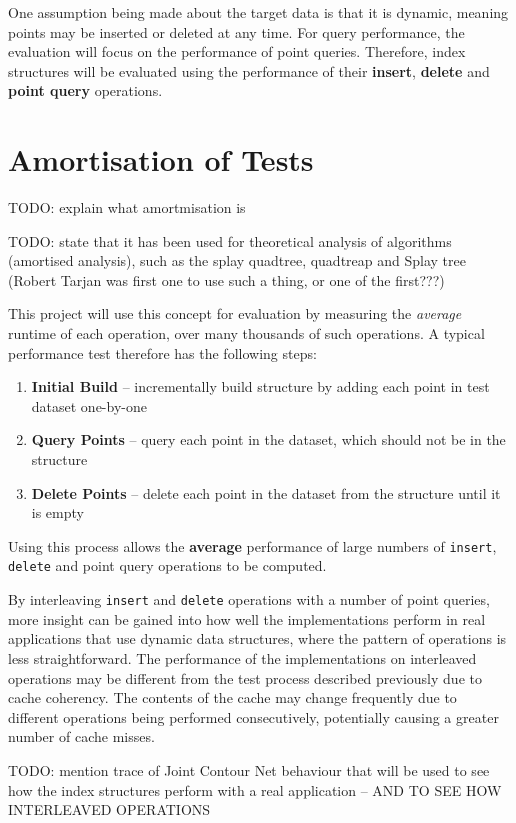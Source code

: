 One assumption being made about the target data is that it is dynamic, meaning points may be inserted or deleted at any time. For query performance, the evaluation will focus on the performance of point queries. Therefore, index structures will be evaluated using the performance of their \textbf{insert}, \textbf{delete} and \textbf{point query} operations.

\section{Amortisation of Tests}

TODO: explain what amortmisation is

TODO: state that it has been used for theoretical analysis of algorithms (amortised analysis), such as the splay quadtree, quadtreap and Splay tree (Robert Tarjan was first one to use such a thing, or one of the first???)

This project will use this concept for evaluation by measuring the \textit{average} runtime of each operation, over many thousands of such operations. A typical performance test therefore has the following steps:
\begin{enumerate}
	\item \textbf{Initial Build} -- incrementally build structure by adding each point in test dataset one-by-one
	\item \textbf{Query Points} -- query each point in the dataset, which should not be in the structure
	\item \textbf{Delete Points} -- delete each point in the dataset from the structure until it is empty
\end{enumerate}
Using this process allows the \textbf{average} performance of large numbers of \texttt{insert}, \texttt{delete} and point query operations to be computed. 

By interleaving \texttt{insert} and \texttt{delete} operations with a number of point queries, more insight can be gained into how well the implementations perform in real applications that use dynamic data structures, where the pattern of operations is less straightforward. The performance of the implementations on interleaved operations may be different from the test process described previously due to cache coherency. The contents of the cache may change frequently due to different operations being performed consecutively, potentially causing a greater number of cache misses.

TODO: mention trace of Joint Contour Net behaviour that will be used to see how the index structures perform with a real application -- AND TO SEE HOW INTERLEAVED OPERATIONS 

